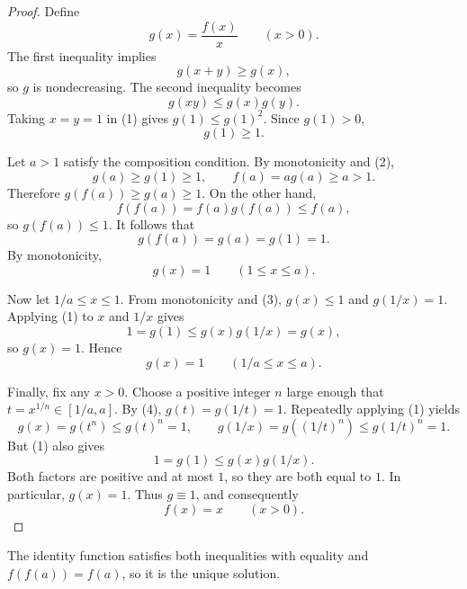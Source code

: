 
\begin{dlsummary}[title={\bfseries Solution 34. The Ratio--Product Squeeze},breakable]

\begin{proof}
Define
\[
g(x)=\frac{f(x)}x\qquad(x>0).
\]
The first inequality implies
\[
g(x+y)\ge g(x),
\]
so $g$ is nondecreasing. The second inequality becomes
\[
g(xy)\le g(x)g(y). \tag{1}
\]
Taking $x=y=1$ in (1) gives $g(1)\le g(1)^2$. Since $g(1)>0$,
\[
g(1)\ge1. \tag{2}
\]

Let $a>1$ satisfy the composition condition. By monotonicity and (2),
\[
g(a)\ge g(1)\ge1,
\qquad
f(a)=ag(a)\ge a>1.
\]
Therefore $g(f(a))\ge g(a)\ge1$. On the other hand,
\[
f(f(a))=f(a)g(f(a))\le f(a),
\]
so $g(f(a))\le1$. It follows that
\[
g(f(a))=g(a)=g(1)=1.
\]
By monotonicity,
\[
g(x)=1\qquad(1\le x\le a). \tag{3}
\]

Now let $1/a\le x\le1$. From monotonicity and (3), $g(x)\le1$ and
$g(1/x)=1$. Applying (1) to $x$ and $1/x$ gives
\[
1=g(1)\le g(x)g(1/x)=g(x),
\]
so $g(x)=1$. Hence
\[
g(x)=1\qquad(1/a\le x\le a). \tag{4}
\]

Finally, fix any $x>0$. Choose a positive integer $n$ large enough that
$t=x^{1/n}\in[1/a,a]$. By (4), $g(t)=g(1/t)=1$. Repeatedly applying
(1) yields
\[
g(x)=g(t^n)\le g(t)^n=1,
\qquad
g(1/x)=g((1/t)^n)\le g(1/t)^n=1.
\]
But (1) also gives
\[
1=g(1)\le g(x)g(1/x).
\]
Both factors are positive and at most $1$, so they are both equal to $1$.
In particular, $g(x)=1$. Thus $g\equiv1$, and consequently
\[
f(x)=x\qquad(x>0).
\]
\end{proof}

The identity function satisfies both inequalities with equality and
$f(f(a))=f(a)$, so it is the unique solution.

\end{dlsummary}